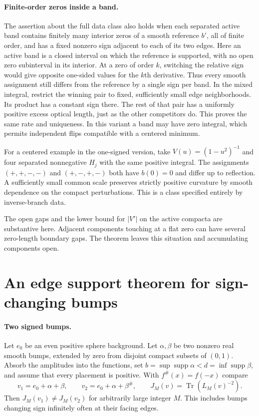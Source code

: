 \documentclass[11pt,letterpaper]{article}
\begin{document}
\paragraph{Finite-order zeros inside a band.}
The assertion about the full data class also holds when each separated active band contains finitely many interior zeros of a smooth reference $b'$, all of finite order, and has a fixed nonzero sign adjacent to each of its two edges. Here an active band is a closed interval on which the reference is supported, with no open zero subinterval in its interior. At a zero of order $k$, switching the relative sign would give opposite one-sided values for the $k$th derivative. Thus every smooth assignment still differs from the reference by a single sign per band. In the mixed integral, restrict the winning pair to fixed, sufficiently small edge neighborhoods. Its product has a constant sign there. The rest of that pair has a uniformly positive excess optical length, just as the other competitors do. This proves the same rate and uniqueness. In this variant a band may have zero integral, which permits independent flips compatible with a centered minimum.

For a centered example in the one-signed version, take \(V(u)=(1-u^2)^{-1}\)
and four separated nonnegative \(H_j\) with the same positive integral.
The assignments \((+,+,-,-)\) and \((+,-,+,-)\) both have \(b(0)=0\)
and differ up to reflection. A sufficiently small common scale preserves
strictly positive curvature by smooth dependence on the compact perturbations.
This is a class specified entirely by inverse-branch data.

The open gaps and the lower bound for $|V'|$ on the active compacta are substantive here. Adjacent components touching at a flat zero can have several zero-length boundary gaps. The theorem leaves this situation and accumulating components open.

\section{An edge support theorem for sign-changing bumps}

\paragraph{Two signed bumps.}
Let $e_0$ be an even positive sphere background. Let $\alpha,\beta$ be two nonzero real smooth bumps, extended by zero from disjoint compact subsets of $(0,1)$. Absorb the amplitudes into the functions, set $b=\sup\operatorname{supp}\alpha<d=\inf\operatorname{supp}\beta$, and assume that every placement is positive. With $f^\#(x)=f(-x)$ compare
\[
 v_1=e_0+\alpha+\beta,\qquad v_2=e_0+\alpha+\beta^\#,\qquad
 J_M(v)=\operatorname{Tr}(L_M(v)^{-2}).
\]
Then $J_M(v_1)\ne J_M(v_2)$ for arbitrarily large integer $M$. This includes bumps changing sign infinitely often at their facing edges.
\end{document}

